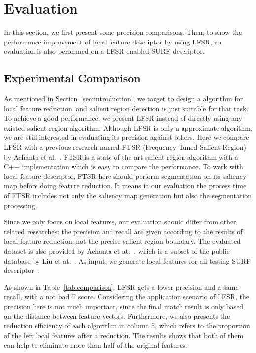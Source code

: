 \section{Evaluation}
\label{sec:evaluation}

In this section, we first present some precision comparisons. Then, to show the performance improvement of local feature descriptor by using LFSR, an evaluation is also performed on a LFSR enabled SURF descriptor.

\subsection{Experimental Comparison}
\label{sec:evaluation_comparison}

As mentioned in Section~\ref{sec:introduction}, we target to design a algorithm for local feature reduction, and salient region detection is just suitable for that task. To achieve a good performance, we present LFSR instead of directly using any existed salient region algorithm. Although LFSR is only a approximate algorithm, we are still interested in evaluating its precision against others. Here we compare LFSR with a previous research named FTSR (Frequency-Tuned Salient Region) by Achanta et al.~\cite{achanta2009frequency}. FTSR is a state-of-the-art salient region algorithm with a C++ implementation which is easy to compare the performance. To work with local feature descriptor, FTSR here should perform segmentation on its saliency map before doing feature reduction. It means in our evaluation the process time of FTSR includes not only the saliency map generation but also the segmentation processing.

Since we only focus on local features, our evaluation should differ from other related researches: the precision and recall are given according to the results of local feature reduction, not the precise salient region boundary. The evaluated dataset is also provided by Achanta et at.~\cite{achanta2009frequency}, which is a subset of the public database by Liu et at.~\cite{liu2011learning}. As input, we generate local features for all testing SURF descriptor~\cite{evans2010opensurf}. 

As shown in Table~\ref{tab:comparison}, LFSR gets a lower precision and a same recall, with a not bad F score. Considering the application scenario of LFSR, the precision here is not much important, since the final match result is only based on the distance between feature vectors. Furthermore, we also presents the reduction efficiency of each algorithm in column 5, which refers to the proportion of the left local features after a reduction. The results shows that both of them can help to eliminate more than half of the original features.

